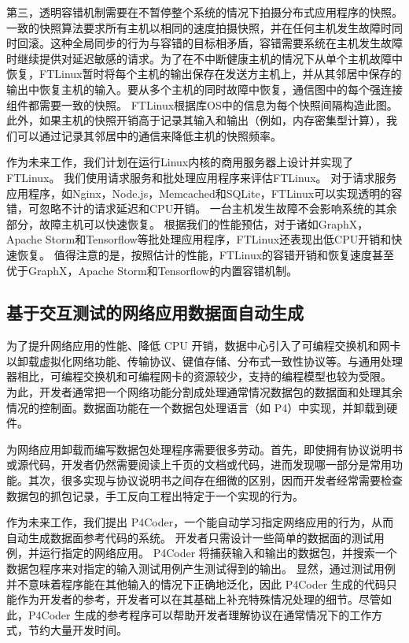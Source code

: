 第三，透明容错机制需要在不暂停整个系统的情况下拍摄分布式应用程序的快照。一致的快照算法要求所有主机以相同的速度拍摄快照，并在任何主机发生故障时同时回滚。这种全局同步的行为与容错的目标相矛盾，容错需要系统在主机发生故障时继续提供对延迟敏感的请求。为了在不中断健康主机的情况下从单个主机故障中恢复，FTLinux暂时将每个主机的输出保存在发送方主机上，并从其邻居中保存的输出中恢复主机的输入。要从多个主机的同时故障中恢复，通信图中的每个强连接组件都需要一致的快照。 FTLinux根据库OS中的信息为每个快照间隔构造此图。此外，如果主机的快照开销高于记录其输入和输出（例如，内存密集型计算），我们可以通过记录其邻居中的通信来降低主机的快照频率。

作为未来工作，我们计划在运行Linux内核的商用服务器上设计并实现了FTLinux。 我们使用请求服务和批处理应用程序来评估FTLinux。 对于请求服务应用程序，如Nginx，Node.js，Memcached和SQLite，FTLinux可以实现透明的容错，可忽略不计的请求延迟和CPU开销。 一台主机发生故障不会影响系统的其余部分，故障主机可以快速恢复。 根据我们的性能预估，对于诸如GraphX，Apache Storm和Tensorflow等批处理应用程序，FTLinux还表现出低CPU开销和快速恢复。 值得注意的是，按照估计的性能，FTLinux的容错开销和恢复速度甚至优于GraphX，Apache Storm和Tensorflow的内置容错机制。


\subsection{基于交互测试的网络应用数据面自动生成}

为了提升网络应用的性能、降低 CPU 开销，数据中心引入了可编程交换机和网卡以卸载虚拟化网络功能、传输协议、键值存储、分布式一致性协议等。与通用处理器相比，可编程交换机和可编程网卡的资源较少，支持的编程模型也较为受限。
为此，开发者通常把一个网络功能分割成处理通常情况数据包的数据面和处理其余情况的控制面。数据面功能在一个数据包处理语言（如 P4）中实现，并卸载到硬件。

为网络应用卸载而编写数据包处理程序需要很多劳动。首先，即使拥有协议说明书或源代码，开发者仍然需要阅读上千页的文档或代码，进而发现哪一部分是常用功能。其次，很多实现与协议说明书之间存在细微的区别，因而开发者经常需要检查数据包的抓包记录，手工反向工程出特定于一个实现的行为。

作为未来工作，我们提出 P4Coder，一个能自动学习指定网络应用的行为，从而自动生成数据面参考代码的系统。
开发者只需设计一些简单的数据面的测试用例，并运行指定的网络应用。
P4Coder 将捕获输入和输出的数据包，并搜索一个数据包程序来对指定的输入测试用例产生测试得到的输出。
显然，通过测试用例并不意味着程序能在其他输入的情况下正确地泛化，因此 P4Coder 生成的代码只能作为开发者的参考，开发者可以在其基础上补充特殊情况处理的细节。尽管如此，P4Coder 生成的参考程序可以帮助开发者理解协议在通常情况下的工作方式，节约大量开发时间。

